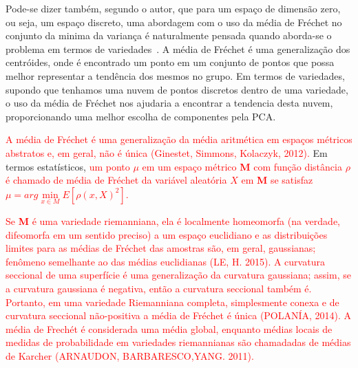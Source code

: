 \documentclass[a4paper,titlepage]{article}
\newcommand{\draftnote}[1]{\marginpar{\tiny\raggedright\textsf{\textcolor{blue}{\hspace{0pt}#1}}}}
\newcommand{\juliana}[1]{\textcolor{red}{#1}}
\begin{document}
Pode-se dizer também, segundo o autor, que para um espaço de dimensão zero, ou
seja, um espaço discreto,  uma abordagem
com o uso da média de Fréchet no conjunto da minima da variança é naturalmente
pensada quando aborda-se o problema em termos de
variedades~\cite{wikipedia:zero:dimensional:2021}.
A média de Fréchet
é uma generalização dos centróides, onde é encontrado um ponto em um conjunto de
pontos que possa melhor representar a tendência dos mesmos no grupo.  Em termos
de variedades, supondo que tenhamos uma nuvem de pontos discretos dentro de uma
variedade, o uso da média de Fréchet nos ajudaria a encontrar a
tendencia desta nuvem, proporcionando uma melhor escolha de componentes pela
PCA. 

\juliana{A média de Fréchet é uma generalização da média aritmética em espaços
métricos abstratos e, em geral, não é única (Ginestet, Simmons, Kolaczyk,
2012).}
Em termos estatísticos,
\juliana{
um ponto $\mu$ em um espaço métrico \textbf{M} com função distância $\rho$ é
chamado de média de Fréchet da variável aleatória $X$ em \textbf{M} se satisfaz
$\mu=arg \min \limits_{x \in M} E[\rho(x,X)^2]$.}

\begin{center}
\vspace{1em}
\vspace{1em}
\end{center}

\juliana{Se \textbf{M} é uma variedade riemanniana, ela é localmente homeomorfa
(na verdade, difeomorfa em um sentido preciso) a um espaço euclidiano e as
distribuições limites para as médias de Fréchet das amostras são, em geral,
gaussianas; fenômeno semelhante ao das médias euclidianas (LE, H. 2015). A
curvatura seccional de uma superfície é uma generalização da curvatura
gaussiana; assim, se a curvatura gaussiana é negativa, então a curvatura
seccional também é. Portanto, em uma variedade Riemanniana completa,
simplesmente conexa e de curvatura seccional não-positiva a média de Fréchet é
única (POLANÍA, 2014). A média de Frechét é considerada uma média global,
enquanto médias locais de medidas de probabilidade em variedades riemannianas
são  chamadadas de médias de Karcher (ARNAUDON, BARBARESCO,YANG.  2011).}
\draftnote{Juliana's comment:Explicar melhor}
\end{document}
